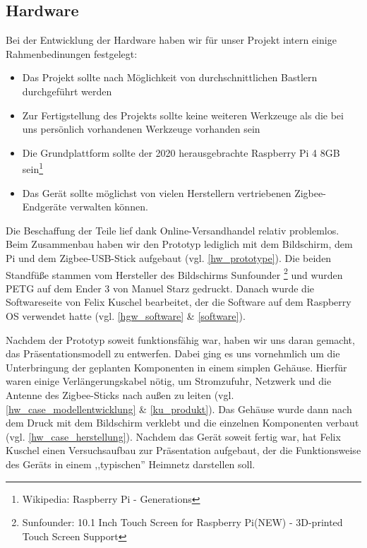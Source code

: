 \subsection{Hardware}\label{hgw_hardware}
Bei der Entwicklung der Hardware haben wir für unser Projekt intern einige Rahmenbedinungen festgelegt:
\begin{itemize}
	\item Das Projekt sollte nach Möglichkeit von durchschnittlichen Bastlern durchgeführt werden
	\item Zur Fertigstellung des Projekts sollte keine weiteren Werkzeuge als die bei uns persönlich vorhandenen Werkzeuge vorhanden sein
	\item Die Grundplattform sollte der 2020 herausgebrachte Raspberry Pi 4 8GB sein\footnote{Wikipedia: Raspberry Pi - Generations}
	\item Das Gerät sollte möglichst von vielen Herstellern vertriebenen Zigbee-Endgeräte verwalten können.
\end{itemize}
\noindent Die Beschaffung der Teile lief dank Online-Versandhandel relativ problemlos. 
Beim Zusammenbau haben wir den Prototyp lediglich mit dem Bildschirm, dem Pi und dem Zigbee-USB-Stick aufgebaut (vgl. \ref{hw_prototype}). 
Die beiden Standfüße stammen vom Hersteller des Bildschirms Sunfounder \footnote{Sunfounder: 10.1 Inch Touch Screen for Raspberry Pi(NEW) - 3D-printed Touch Screen Support} und wurden PETG auf dem Ender 3 von Manuel Starz gedruckt. 
Danach wurde die Softwareseite von Felix Kuschel bearbeitet, der die Software auf dem Raspberry OS verwendet hatte (vgl. \ref{hgw_software} \& \ref{software}).\par
\noindent Nachdem der Prototyp soweit funktionsfähig war, haben wir uns daran gemacht, das Präsentationsmodell zu entwerfen. 
Dabei ging es uns vornehmlich um die Unterbringung der geplanten Komponenten in einem simplen Gehäuse. 
Hierfür waren einige Verlängerungskabel nötig, um Stromzufuhr, Netzwerk und die Antenne des Zigbee-Sticks nach außen zu leiten (vgl.\ref{hw_case_modellentwicklung} \& \ref{ku_produkt}). 
Das Gehäuse wurde dann nach dem Druck mit dem Bildschirm verklebt und die einzelnen Komponenten verbaut (vgl. \ref{hw_case_herstellung}). 
Nachdem das Gerät soweit fertig war, hat Felix Kuschel einen Versuchsaufbau zur Präsentation aufgebaut, der die Funktionsweise des Geräts in einem ,,typischen'' Heimnetz darstellen soll.